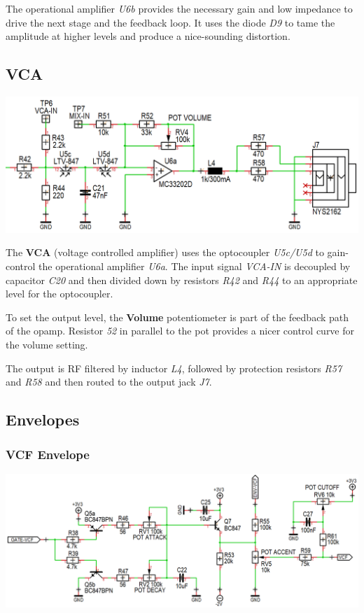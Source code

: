 \documentclass{scrartcl}
\begin{document}
The operational amplifier \emph{U6b} provides the necessary gain and low impedance to drive the next stage and the feedback loop. It uses the diode \emph{D9} to tame the amplitude at higher levels and produce a nice-sounding distortion.

\pagebreak
\subsection{VCA}
\vspace{0.25cm}
\begin{center}
    \includegraphics[scale=0.40]{assets/schema-vca.png}
\end{center}

The \textbf{VCA} (voltage controlled amplifier) uses the optocoupler \emph{U5c/U5d} to gain-control the operational amplifier \emph{U6a}. The input signal \emph{VCA-IN} is decoupled by capacitor \emph{C20} and then divided down by resistors \emph{R42} and \emph{R44} to an appropriate level for the optocoupler.

To set the output level, the \textbf{Volume} potentiometer is part of the feedback path of the opamp. Resistor \emph{52} in parallel to the pot provides a nicer control curve for the volume setting.

The output is RF filtered by inductor \emph{L4}, followed by protection resistors \emph{R57} and \emph{R58} and then routed to the output jack \emph{J7}.

\subsection{Envelopes}

\subsubsection{VCF Envelope}

\begin{center}
    \includegraphics[scale=0.35]{assets/schema-ar-vcf.png}
\end{center}
\end{document}

